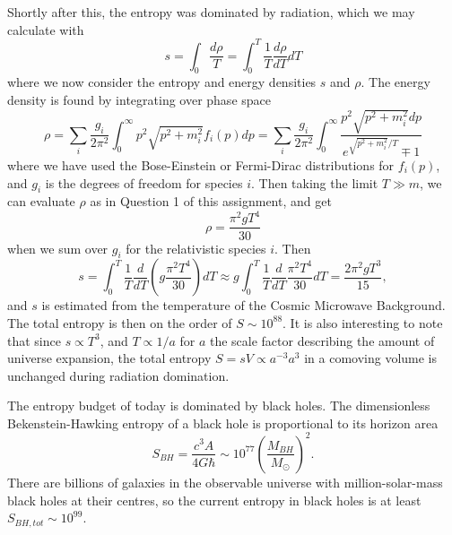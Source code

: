 \documentclass[12pt]{article}
\begin{document}
Shortly after this, the entropy was dominated by radiation, which we may calculate with \cite{hirata} 
\begin{equation*}
s=\int_{0} \frac{d \rho}{T}=\int_{0}^{T} \frac{1}{T} \frac{d \rho}{d T} d T
\end{equation*}
where we now consider the entropy and energy densities $s$ and $\rho$. The energy density is found by integrating over phase space
\begin{equation*}
\rho=\sum_{i} \frac{g_{i}}{2 \pi^{2}} \int_{0}^{\infty} p^{2} \sqrt{p^{2}+m_{i}^{2}} f_{i}(p) d p=\sum_{i} \frac{g_{i}}{2 \pi^{2}} \int_{0}^{\infty} \frac{p^{2} \sqrt{p^{2}+m_{i}^{2}} d p}{e ^ {\sqrt{p^{2}+m_{i}^{2}} / T} \mp 1}
\end{equation*}
where we have used the Bose-Einstein or Fermi-Dirac distributions for $f_{i}(p)$, and $g_i$ is the degrees of freedom for species $i$. Then taking the limit $T \gg m$, we can evaluate $\rho$ as in Question 1 of this assignment, and get
\begin{equation*}
\rho=\frac{\pi^{2} g T^{4}}{30}
\end{equation*}
when we sum over $g_i$ for the relativistic species $i$. Then
\begin{equation*}
s=\int_{0}^{T} \frac{1}{T} \frac{d}{d T}\left(g \frac{\pi^{2} T^{4}}{30}\right) d T \approx g \int_{0}^{T} \frac{1}{T} \frac{d}{d T} \frac{\pi^{2} T^{4}}{30} d T=\frac{2 \pi^{2} g T^{3}}{15},
\end{equation*}
and $s$ is estimated from the temperature of the Cosmic Microwave Background. The total entropy is then on the order of $S \sim 10^{88}$. It is also interesting to note that since $s\propto T^3$, and $T\propto 1/a$ for $a$ the scale factor describing the amount of universe expansion, the total entropy $S = sV \propto a^{-3}a^{3}$ in a comoving volume is unchanged during radiation domination.\cite{Lineweaver}\par 

The entropy budget of today is dominated by black holes. The dimensionless Bekenstein-Hawking entropy of a black hole is proportional to its horizon area \cite{Egan2010}
\begin{equation*}
S_{BH} = \frac{c^3 A}{4G\hbar} \sim 10^{77}\left(\frac{M_{BH}}{M_\odot}\right)^2.
\end{equation*}
There are billions of galaxies in the observable universe with million-solar-mass black holes at their centres, so the current entropy in black holes is at least $S_{BH,tot} \sim 10^{99}$.\cite{Carroll2005}\par 
\end{document}
